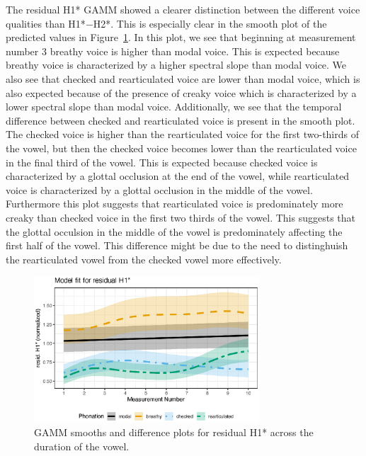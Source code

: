 The residual H1* GAMM showed a clearer distinction between the different voice qualities than H1*$-$H2*. This is especially clear in the smooth plot of the predicted values in Figure~\ref{fig:rh1_model_fit}. In this plot, we see that beginning at measurement number 3 breathy voice is higher than modal voice. This is expected because breathy voice is characterized by a higher spectral slope than modal voice. We also see that checked and rearticulated voice are lower than modal voice, which is also expected because of the presence of creaky voice which is characterized by a lower spectral slope than modal voice. Additionally, we see that the temporal difference between checked and rearticulated voice is present in the smooth plot. The checked voice is higher than the rearticulated voice for the first two-thirds of the vowel, but then the checked voice becomes lower than the rearticulated voice in the final third of the vowel. This is expected because checked voice is characterized by a glottal occlusion at the end of the vowel, while rearticulated voice is characterized by a glottal occlusion in the middle of the vowel. Furthermore this plot suggests that rearticulated voice is predominately more creaky than checked voice in the first two thirds of the vowel. This suggests that the glottal occulsion in the middle of the vowel is predominately affecting the first half of the vowel. This difference might be due to the need to distinghuish the rearticulated vowel from the checked vowel more effectively. 

\begin{figure}[h!]
  \centering
  \includegraphics[width = 0.75\textwidth]{images/SpectralSlopes_GAMMs/rh1_model_fit.eps}
  \caption{GAMM smooths and difference plots for residual H1* across the duration of the vowel.}
  \label{fig:rh1_model_fit}
\end{figure}

